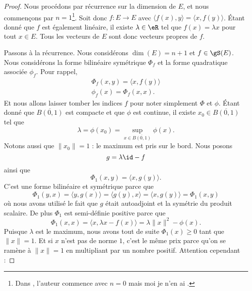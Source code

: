 \begin{proof}
	Nous procédons par récurrence sur la dimension de \( E\), et nous commençons par \( n=1\)\footnote{Dans \cite{KXjFWKA}, l'auteur commence avec \( n=0\) mais moi je n'en ai .}. Soit donc \( f\colon E\to E\) avec \( \langle f(x), y\rangle =\langle x, f(y)\rangle \). Étant donné que \( f\) est également linéaire, il existe \( \lambda\in \eR\) tel que \( f(x)=\lambda x\) pour tout \( x\in E\). Tous les vecteurs de \( E\) sont donc vecteurs propres de \( f\).

	Passons à la récurrence. Nous considérons \( \dim(E)=n+1\) et \( f\in\gS(E)\). Nous considérons la forme bilinéaire symétrique \( \Phi_f\) et la forme quadratique associée \( \phi_f\). Pour rappel,
	\begin{subequations}
		\begin{align}
			\Phi_f(x,y)=\langle x, f(y)\rangle \\
			\phi_f(x)=\Phi_f(x,x).
		\end{align}
	\end{subequations}
	Et nous allons laisser tomber les indices \( f\) pour noter simplement \( \Phi\) et \( \phi\). Étant donné que \( \overline{ B(0,1) }\) est compacte et que \( \phi\) est continue, il existe \( x_0\in\overline{ B(0,1) }\) tel que
	\begin{equation}
		\lambda=\phi(x_0)=\sup_{x\in\overline{ B(0,1) }}\phi(x).
	\end{equation}
	Notons aussi que \( \| x_0 \|=1\) : le maximum est pris sur le bord. Nous posons
	\begin{equation}
		g=\lambda\id-f
	\end{equation}
	ainsi que
	\begin{equation}
		\Phi_1(x,y)=\langle x, g(y)\rangle .
	\end{equation}
	C'est une forme bilinéaire et symétrique parce que
	\begin{equation}
		\Phi_1(y,x)=\langle y, g(x)\rangle =\langle g(y), x\rangle =\langle x, g(y)\rangle =\Phi_1(x,y)
	\end{equation}
	où nous avons utilisé le fait que \( g\) était autoadjoint et la symétrie du produit scalaire. De plus \( \Phi_1\) est semi-définie positive parce que
	\begin{equation}
		\Phi_1(x,x)=\langle x, \lambda x-f(x)\rangle =\lambda\| x \|^2-\phi(x).
	\end{equation}
	Puisque \( \lambda\) est le maximum, nous avons tout de suite \( \Phi_1(x)\geq 0\) tant que \( \| x \|=1\). Et si \( x\) n'est pas de norme \( 1\), c'est le même prix parce qu'on se ramène à \( \| x \|=1\) en multipliant par un nombre positif. Attention cependant :

\end{proof}
